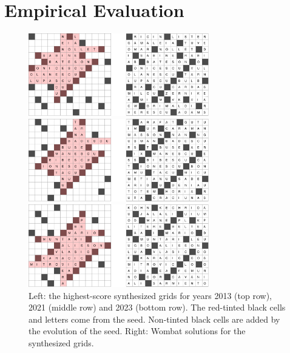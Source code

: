 \section{Empirical Evaluation}


\begin{figure}[!t]
\centering
\includegraphics[width=0.7\textwidth]{_empiricalSupport/y-2013/results/_runWombat/mrmeGrids_y2013-60x932-14400x352-14113466-paper.pdf}

\vspace{0.25cm}

\includegraphics[width=0.7\textwidth]{_empiricalSupport/y-2021/results/_runWombat/mrmeGrids_feb3-60x38035-14400x224-13741779-paper.pdf}

\vspace{0.25cm}

\includegraphics[width=0.7\textwidth]{_empiricalSupport/y-2023/results/_runWombat/mrmeGrids_y2023-60x446-14400x352-14179462-paper.pdf}

\caption{Left: the highest-score synthesized grids for years 2013 (top row), 2021 (middle row) and 2023 (bottom row). The red-tinted black cells and letters come from the seed. Non-tinted black cells are added by the evolution of the seed. Right: {\sc Wombat} solutions for the synthesized grids.}
\label{fig:results}
\end{figure}


